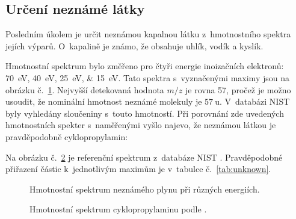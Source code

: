 \documentclass{protokol}
\newcommand\mz{m/z}
\begin{document}
\subsection{Určení neznámé látky}
\label{sec:unknown}
Posledním úkolem je určit neznámou kapalnou látku z~hmotnostního spektra
jejích výparů.
O~kapalině je známo, že obsahuje uhlík, vodík a kyslík.

Hmotnostní spektrum bylo změřeno pro čtyři energie inoizačních elektronů:
\SIlist[list-separator={, }]{70;40;25;15}{\electronvolt}.
Tato spektra s~vyznačenými maximy jsou na obrázku č.~\ref{fig:unknown-all}.
Nejvyšší detekovaná hodnota $\mz$ je rovna \SI{57}{\thomson},
pročež je možno usoudit, že nominální hmotnost neznámé molekuly
je $\SI{57}{\amu}$.
V~databázi NIST~\parencite{nist} byly vyhledány sloučeniny s~touto hmotností.
Při porovnání zde uvedených hmotnostních spekter s~naměřenými vyšlo najevo,
že neznámou látkou je pravděpodobně cyklopropylamin:
\begin{center}
\end{center}

Na obrázku č.~\ref{fig:cyclopropylamine-nist} je referenční spektrum
z~databáze NIST \parencite{nist}.
Pravděpodobné přiřazení částic k~jednotlivým maximům je
v~tabulce č.~\ref{tab:unknown}.

\begin{figure}[htp]
	\centering
	
	\caption{Hmotnostní spektrum neznámého plynu při různých energiích.}
	\label{fig:unknown-all}
\end{figure}

\begin{figure}[htp]
	\centering
	
	\caption{Hmotnostní spektrum cyklopropylaminu podle \cite{nist}.}
	\label{fig:cyclopropylamine-nist}
\end{figure}
\end{document}
